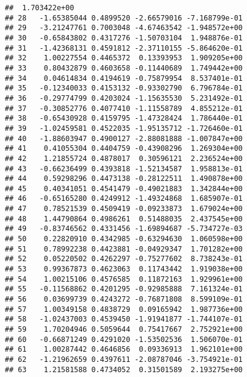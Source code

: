 \documentclass[
]{article}
\newenvironment{Shaded}{\begin{snugshade}}{\end{snugshade}}
\newcommand{\CommentTok}[1]{\textcolor[rgb]{0.56,0.35,0.01}{\textit{#1}}}
\newcommand{\FunctionTok}[1]{\textcolor[rgb]{0.13,0.29,0.53}{\textbf{#1}}}
\newcommand{\NormalTok}[1]{#1}
\newcommand{\SpecialCharTok}[1]{\textcolor[rgb]{0.81,0.36,0.00}{\textbf{#1}}}
\begin{document}
\begin{Shaded}
\end{Shaded}

\begin{verbatim}
##  1.703422e+00
## 28   -1.65385044 0.4899520 -2.66579016 -7.168799e-01
## 29   -3.21247761 0.7003048 -4.67463542 -1.948572e+00
## 30   -0.65843802 0.4317276 -1.50703104  1.948876e-01
## 31   -1.42368131 0.4591812 -2.37110155 -5.864620e-01
## 32    1.00227554 0.4465372  0.13393953  1.909205e+00
## 33    0.80432879 0.4603658 -0.11440689  1.749442e+00
## 34    0.04614834 0.4194619 -0.75879954  8.537401e-01
## 35   -0.12340033 0.4153132 -0.93302790  6.796784e-01
## 36   -0.29774799 0.4203024 -1.15635530  5.231492e-01
## 37   -0.30852776 0.4077410 -1.11558789  4.855212e-01
## 38   -0.65430928 0.4159795 -1.47328424  1.786440e-01
## 39   -1.02459581 0.4522035 -1.95135712 -1.726460e-01
## 40   -1.88603947 0.4900127 -2.88081888 -1.007847e+00
## 41    0.41055304 0.4404759 -0.43908296  1.269304e+00
## 42    1.21855724 0.4878017  0.30596121  2.236524e+00
## 43   -0.66236499 0.4393818 -1.52134587  1.958813e-01
## 44    0.59298296 0.4473138 -0.28122511  1.490878e+00
## 45    0.40341051 0.4541479 -0.49021883  1.342844e+00
## 46   -0.65165280 0.4249912 -1.49324868  1.685907e-01
## 47    0.78521539 0.4509419 -0.09233873  1.679024e+00
## 48    1.44790864 0.4986261  0.51488035  2.437545e+00
## 49   -0.83746562 0.4331456 -1.69894687 -5.734727e-03
## 50    0.22820910 0.4342985 -0.63294630  1.060598e+00
## 51    0.78992238 0.4423881 -0.04929347  1.701282e+00
## 52    0.05220502 0.4262297 -0.75277602  8.738243e-01
## 53    0.99367873 0.4623063  0.11743442  1.919038e+00
## 54    1.00215106 0.4576585  0.11872163  1.929961e+00
## 55   -0.11568862 0.4201295 -0.92985888  7.161324e-01
## 56    0.03699739 0.4243272 -0.76871808  8.599109e-01
## 57    1.00349158 0.4838729  0.09165942  1.987736e+00
## 58   -1.02437003 0.4539450 -1.91941877 -1.744107e-01
## 59    1.70204946 0.5059644  0.75417667  2.752921e+00
## 60   -0.66871249 0.4291020 -1.53502536  1.506070e-01
## 61    1.00287442 0.4646856  0.09336913  1.962101e+00
## 62   -1.21962659 0.4397611 -2.08787046 -3.754921e-01
## 63    1.21581588 0.4734052  0.31501589  2.193275e+00

\end{verbatim}
\end{document}
